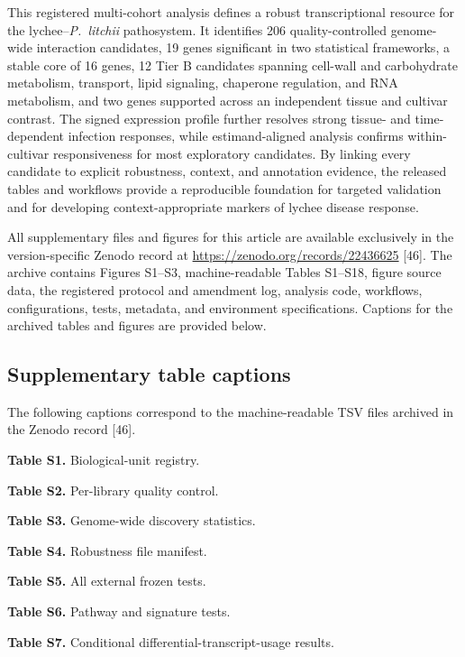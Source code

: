 \documentclass[referee,pdflatex,sn-basic,Numbered]{sn-jnl}
\newcommand{\Pl}{\textit{P.~litchii}}
\begin{document}
This registered multi-cohort analysis defines a robust transcriptional resource for the lychee--\Pl{} pathosystem. It identifies 206 quality-controlled genome-wide interaction candidates, 19 genes significant in two statistical frameworks, a stable core of 16 genes, 12 Tier B candidates spanning cell-wall and carbohydrate metabolism, transport, lipid signaling, chaperone regulation, and RNA metabolism, and two genes supported across an independent tissue and cultivar contrast. The signed expression profile further resolves strong tissue- and time-dependent infection responses, while estimand-aligned analysis confirms within-cultivar responsiveness for most exploratory candidates. By linking every candidate to explicit robustness, context, and annotation evidence, the released tables and workflows provide a reproducible foundation for targeted validation and for developing context-appropriate markers of lychee disease response.

\backmatter


All supplementary files and figures for this article are available exclusively in the version-specific Zenodo record at \url{https://zenodo.org/records/22436625} [46]. The archive contains Figures S1--S3, machine-readable Tables S1--S18, figure source data, the registered protocol and amendment log, analysis code, workflows, configurations, tests, metadata, and environment specifications. Captions for the archived tables and figures are provided below.

\subsection*{Supplementary table captions}

The following captions correspond to the machine-readable TSV files archived in the Zenodo record [46].

\textbf{Table S1.} Biological-unit registry.

\textbf{Table S2.} Per-library quality control.

\textbf{Table S3.} Genome-wide discovery statistics.

\textbf{Table S4.} Robustness file manifest.

\textbf{Table S5.} All external frozen tests.

\textbf{Table S6.} Pathway and signature tests.

\textbf{Table S7.} Conditional differential-transcript-usage results.
\end{document}
